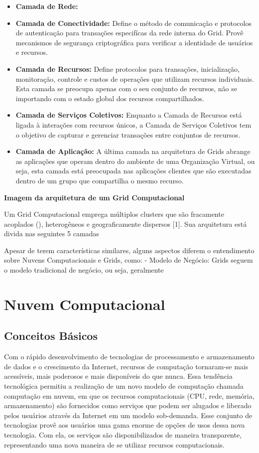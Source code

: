 \begin{itemize}
	\item \textbf{Camada de Rede:} 
	\item \textbf{Camada de Conectividade:} Define o método de comunicação e protocolos de autenticação para transações especifícas da rede interna do Grid. Provê mecanismos de segurança criptográfica para verificar a identidade de usuários e recursos.
	\item \textbf{Camada de Recursos:} Define protocolos para transações, inicialização, monitoração, controle e custos de operações que utilizam recursos individuais. Esta camada se preocupa apenas com o seu conjunto de recursos, não se importando com o estado global dos recursos compartilhados.
	\item \textbf{Camada de Serviços Coletivos:} Enquanto a Camada de Recursos está ligada à interações com recursos únicos, a Camada de Serviços Coletivos tem o objetivo de capturar e gerenciar transações entre conjuntos de recursos.
	\item \textbf{Camada de Aplicação:} A última camada na arquitetura de Grids abrange as aplicações que operam dentro do ambiente de uma Organização Virtual, ou seja, esta camada está preocupada nas aplicações clientes que são executadas dentro de um grupo que compartilha o mesmo recurso.
\end{itemize}

\textbf{Imagem da arquitetura de um Grid Computacional}

Um Grid Computacional emprega múltiplos clusters que são fracamente acoplados (), heterogêneos e geograficamente dispersos [1]. Sua arquitetura está divida nas seguintes 5 camadas

Apesar de terem características similares, alguns aspectos diferem o entendimento sobre Nuvens Computacionais e Grids, como:
- Modelo de Negócio: Grids seguem o modelo tradicional de negócio, ou seja, geralmente 

\section{Nuvem Computacional} \label{cap2sec2}

\subsection{Conceitos Básicos} \label{cap2sec2subsec1}

Com o rápido desenvolvimento de tecnologias de processamento e armazenamento de dados e o crescimento da Internet, recursos de computação tornaram-se mais acessíveis, mais poderosos e mais disponíveis do que nunca. Essa tendência tecnológica permitiu a realização de um novo modelo de computação chamada computação em nuvem, em que os recursos computacionais (CPU, rede, memória, armazenamento) são fornecidos como serviços que podem ser alugados e liberado pelos usuários através da Internet em um modelo sob-demanda. Esse conjunto de tecnologias provê aos usuários uma gama enorme de opções de usos dessa nova tecnologia. Com ela, os serviços são disponibilizados de maneira transparente, representando uma nova maneira de se utilizar recursos computacionais. 

